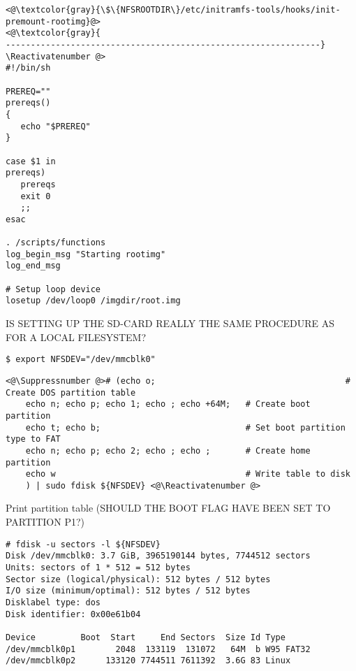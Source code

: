 \Suppressnumber\begin{lstlisting}[]
<@\textcolor{gray}{\$\{NFSROOTDIR\}/etc/initramfs-tools/hooks/init-premount-rootimg}@>
<@\textcolor{gray}{
---------------------------------------------------------------}
\Reactivatenumber @>
#!/bin/sh

PREREQ=""
prereqs()
{
   echo "$PREREQ"
}

case $1 in
prereqs)
   prereqs
   exit 0
   ;;
esac

. /scripts/functions
log_begin_msg "Starting rootimg"
log_end_msg

# Setup loop device
losetup /dev/loop0 /imgdir/root.img
\end{lstlisting}
\FloatBarrier
\vspace{-5mm}














IS SETTING UP THE SD-CARD REALLY THE SAME PROCEDURE AS FOR A LOCAL FILESYSTEM?

\begin{lstlisting}[]
$ export NFSDEV="/dev/mmcblk0"
\end{lstlisting}
\FloatBarrier
\vspace{-5mm}

\begin{lstlisting}[]
<@\Suppressnumber @># (echo o;                                      # Create DOS partition table
    echo n; echo p; echo 1; echo ; echo +64M;   # Create boot partition
    echo t; echo b;                             # Set boot partition type to FAT
    echo n; echo p; echo 2; echo ; echo ;       # Create home partition
    echo w                                      # Write table to disk
    ) | sudo fdisk ${NFSDEV} <@\Reactivatenumber @>
\end{lstlisting}
\FloatBarrier
\vspace{-5mm}

Print partition table (SHOULD THE BOOT FLAG HAVE BEEN SET TO PARTITION P1?)
\begin{lstlisting}[]
# fdisk -u sectors -l ${NFSDEV}
Disk /dev/mmcblk0: 3.7 GiB, 3965190144 bytes, 7744512 sectors
Units: sectors of 1 * 512 = 512 bytes
Sector size (logical/physical): 512 bytes / 512 bytes
I/O size (minimum/optimal): 512 bytes / 512 bytes
Disklabel type: dos
Disk identifier: 0x00e61b04

Device         Boot  Start     End Sectors  Size Id Type
/dev/mmcblk0p1        2048  133119  131072   64M  b W95 FAT32
/dev/mmcblk0p2      133120 7744511 7611392  3.6G 83 Linux
\end{lstlisting}
\FloatBarrier
\vspace{-5mm}

